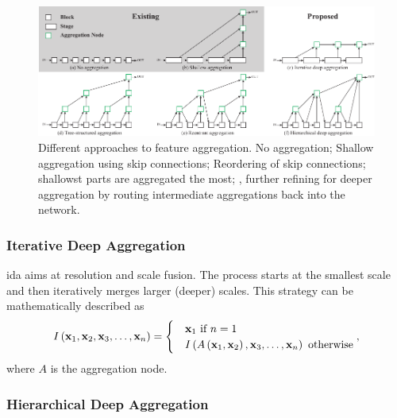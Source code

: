 \begin{figure}[t]
    \centerline{\includegraphics[width=0.8\linewidth]{figures/theoretical_foundations/dla_existing_vs_proposed.pdf}}
    \caption[\Gls{dla} proposed solution]{Different approaches to feature aggregation.  No aggregation;  Shallow aggregation using skip connections;  Reordering of skip connections;  shallowst parts are aggregated the most; ,  further refining for deeper aggregation by routing intermediate aggregations back into the network. }
    \label{fig:DLADiffApproaches}
\end{figure}

\subsubsection{Iterative Deep Aggregation}

\gls{ida} aims at resolution and scale fusion. The process starts at the smallest scale and then iteratively merges larger (deeper) scales. This strategy can be mathematically described as
\begin{equation}
    \label{eq:IterativeDeepAggregation}
    {I} \left( \mathbf{x}_1, \mathbf{x}_2, \mathbf{x}_3, \dots, \mathbf{x}_n \right) =
    \begin{cases}
         & \mathbf{x}_1 \text{ if } n = 1                                                                \\
         & {I} \left( {A} \left( \mathbf{x}_1, \mathbf{x}_2 \right), \mathbf{x}_3, \dots, \mathbf{x}_n \right) \text{ otherwise}
    \end{cases},
\end{equation}
where $A$ is the aggregation node.

\subsubsection{Hierarchical Deep Aggregation}

